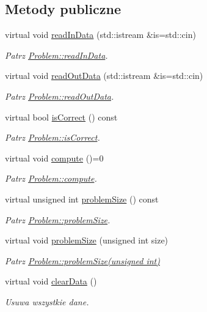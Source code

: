 \subsection*{Metody publiczne}
\begin{DoxyCompactItemize}
\item 
virtual void \hyperlink{class_standard_problem_aaaf63ba0accbe5a4d6182fef2ccc448b}{read\-In\-Data} (std\-::istream \&is=std\-::cin)
\begin{DoxyCompactList}\small\item\em Patrz \hyperlink{class_problem_a8e3f5755480a44a5dfe767b5429572c9}{Problem\-::read\-In\-Data}. \end{DoxyCompactList}\item 
virtual void \hyperlink{class_standard_problem_a57d12a8e60de6af15273df44527a0769}{read\-Out\-Data} (std\-::istream \&is=std\-::cin)
\begin{DoxyCompactList}\small\item\em Patrz \hyperlink{class_problem_af92be524acb6f1d6b484eff1fce07d2c}{Problem\-::read\-Out\-Data}. \end{DoxyCompactList}\item 
virtual bool \hyperlink{class_standard_problem_aeab390b5968292a6bcb95d13d98bc62e}{is\-Correct} () const 
\begin{DoxyCompactList}\small\item\em Patrz \hyperlink{class_problem_a55aef8681a2282a431abb77039cd01c1}{Problem\-::is\-Correct}. \end{DoxyCompactList}\item 
virtual void \hyperlink{class_standard_problem_ad9d90f5c981806bed7c6b4a08abb0384}{compute} ()=0
\begin{DoxyCompactList}\small\item\em Patrz \hyperlink{class_problem_a278fa7a764e308758dbf9c07757ef037}{Problem\-::compute}. \end{DoxyCompactList}\item 
virtual unsigned int \hyperlink{class_standard_problem_a5a17f86a21c915ae373a273a01be91ac}{problem\-Size} () const 
\begin{DoxyCompactList}\small\item\em Patrz \hyperlink{class_problem_a938aceef78b28c64c03616a3fa619ec0}{Problem\-::problem\-Size}. \end{DoxyCompactList}\item 
virtual void \hyperlink{class_standard_problem_acddecc170b1e6e1c662df258ebfd5881}{problem\-Size} (unsigned int size)
\begin{DoxyCompactList}\small\item\em Patrz \hyperlink{class_problem_aa67aec5ea247cc9e6616a71345399a08}{Problem\-::problem\-Size(unsigned int)} \end{DoxyCompactList}\item 
virtual void \hyperlink{class_standard_problem_a18639f20294c49814faf32a04f1317fa}{clear\-Data} ()
\begin{DoxyCompactList}\small\item\em Usuwa wszystkie dane. \end{DoxyCompactList}\end{DoxyCompactItemize}

